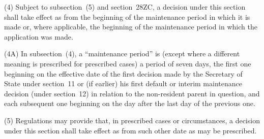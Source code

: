 \documentclass[12pt,a4paper]{article}
\begin{document}
(4) Subject to subsection~(5)  and section~28ZC, a decision under this section shall take effect as from the beginning of the maintenance period in which it is made or, where applicable, the beginning of the maintenance period in which the application was made.

(4A) In subsection~(4), a “maintenance period” is (except where a different meaning is prescribed for prescribed cases) a period of seven days, the first one beginning on the effective date of the first decision made by the Secretary of State under section~11 or (if earlier) his first default or interim maintenance decision (under section~12) in relation to the non-resident parent in question, and each subsequent one beginning on the day after the last day of the previous one.

(5) Regulations may provide that, in prescribed cases or circumstances, a decision under this section shall take effect as from such other date as may be prescribed.

\end{document}
